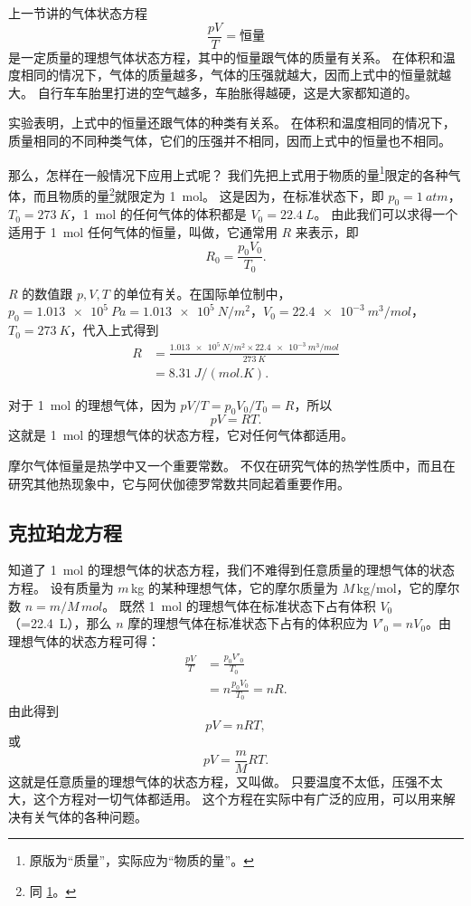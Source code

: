 上一节讲的气体状态方程
\[\frac{pV}{T}=\text{恒量} \]
是一定质量的理想气体状态方程，其中的恒量跟气体的质量有关系。
在体积和温度相同的情况下，气体的质量越多，气体的压强就越大，因而上式中的恒量就越大。
自行车车胎里打进的空气越多，车胎胀得越硬，这是大家都知道的。

实验表明，上式中的恒量还跟气体的种类有关系。
在体积和温度相同的情况下，质量相同的不同种类气体，它们的压强并不相同，因而上式中的恒量也不相同。

那么，怎样在一般情况下应用上式呢？
我们先把上式用于物质的量\footnote{\label{fn:mass}原版为“质量”，实际应为“物质的量”。}限定的各种气体，而且物质的量\footnote{同 \ref{fn:mass}。}就限定为 \qty{1}{mol}。
这是因为，在标准状态下，即 $p_0=\qty{1}{atm}$，$T_0=\qty{273}{K}$，\qty{1}{mol} 的任何气体的体积都是 $V_0=\qty{22.4}{L}$。
由此我们可以求得一个适用于 \qty{1}{mol} 任何气体的恒量，叫做，它通常用 $R$ 来表示，即
\[R_0=\frac{p_0V_0}{T_0}.\]

$R$ 的数值跟 $p,V,T$ 的单位有关。在国际单位制中，$p_0=\qty{1.013e5}{Pa}=\qty{1.013e5}{N/m^2}$，$V_0=\qty{22.4e-3}{m^3/mol}$，$T_0=\qty{273}{K}$，代入上式得到
\[\begin{split}
R&=\frac{\qty{1.013e5}{N/m^2} \times \qty{22.4e-3}{m^3/mol}}{\qty{273}{K}}\\
&=\qty{8.31}{J/(mol.K)}.
\end{split} \]

对于 \qty{1}{mol} 的理想气体，因为 $pV/T=p_0V_0/T_0=R$，所以
\[pV=RT.\]
这就是 \qty{1}{mol} 的理想气体的状态方程，它对任何气体都适用。

摩尔气体恒量是热学中又一个重要常数。
不仅在研究气体的热学性质中，而且在研究其他热现象中，它与阿伏伽德罗常数共同起着重要作用。

\subsection{克拉珀龙方程} 

知道了 \qty{1}{mol} 的理想气体的状态方程，我们不难得到任意质量的理想气体的状态方程。
设有质量为 $m$\,\unit{kg} 的某种理想气体，它的摩尔质量为 $M$\,\unit{kg/mol}，它的摩尔数 $n=m/M \,\unit{mol}$。
既然 \qty{1}{mol} 的理想气体在标准状态下占有体积 $V_0$（=\qty{22.4}{L}），那么 $n$ 摩的理想气体在标准状态下占有的体积应为 $V'_0=nV_0$。由理想气体的状态方程可得：
\[\begin{split}
\frac{pV}{T}&=\frac{p_0V'_0}{T_0}\\
&=n\frac{p_0V_0}{T_0}=nR.
\end{split} \]
由此得到
\[pV=nRT,\]
或
\[pV=\frac{m}{M}RT.\]
这就是任意质量的理想气体的状态方程，又叫做。
只要温度不太低，压强不太大，这个方程对一切气体都适用。
这个方程在实际中有广泛的应用，可以用来解决有关气体的各种问题。

